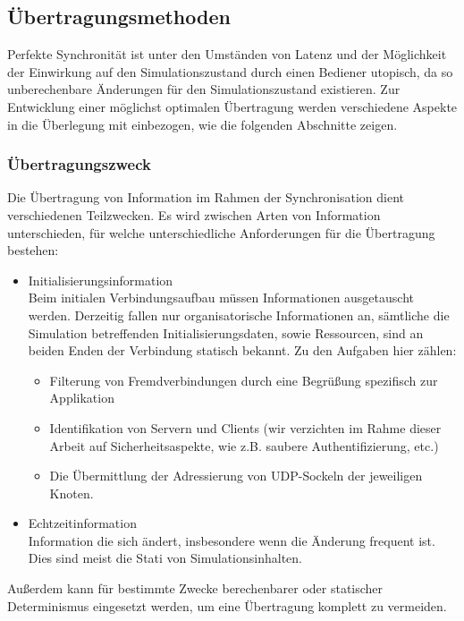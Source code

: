 \documentclass[11pt,twoside,a4paper]{article}
\begin{document}
\subsection{Übertragungsmethoden}
\label{sec:transmission_formats}
Perfekte Synchronität ist unter den Umständen von Latenz und der Möglichkeit der Einwirkung auf den Simulationszustand durch einen Bediener utopisch, da so unberechenbare Änderungen für den Simulationszustand existieren.
Zur Entwicklung einer möglichst optimalen Übertragung werden verschiedene Aspekte in die Überlegung mit einbezogen, wie die folgenden Abschnitte zeigen.

\subsubsection{Übertragungszweck}
Die Übertragung von Information im Rahmen der Synchronisation dient verschiedenen Teilzwecken.
Es wird zwischen Arten von Information unterschieden, für welche unterschiedliche Anforderungen für die Übertragung bestehen:
\begin{itemize}
\item Initialisierungsinformation\\
Beim initialen Verbindungsaufbau müssen Informationen ausgetauscht werden.
Derzeitig fallen nur organisatorische Informationen an, sämtliche die Simulation betreffenden Initialisierungsdaten, sowie Ressourcen, sind an beiden Enden der Verbindung statisch bekannt.
Zu den Aufgaben hier zählen:
\begin{itemize}
\item Filterung von Fremdverbindungen durch eine Begrüßung spezifisch zur Applikation
\item Identifikation von Servern und Clients (wir verzichten im Rahme dieser Arbeit auf Sicherheitsaspekte, wie z.B. saubere Authentifizierung, etc.)
\item Die Übermittlung der Adressierung von UDP-Sockeln der jeweiligen Knoten.
\end{itemize}
\item Echtzeitinformation\\
Information die sich ändert, insbesondere wenn die Änderung frequent ist.
Dies sind meist die Stati von Simulationsinhalten.
\end{itemize}

Außerdem kann für bestimmte Zwecke berechenbarer oder statischer Determinismus eingesetzt werden, um eine Übertragung komplett zu vermeiden.
\end{document}
